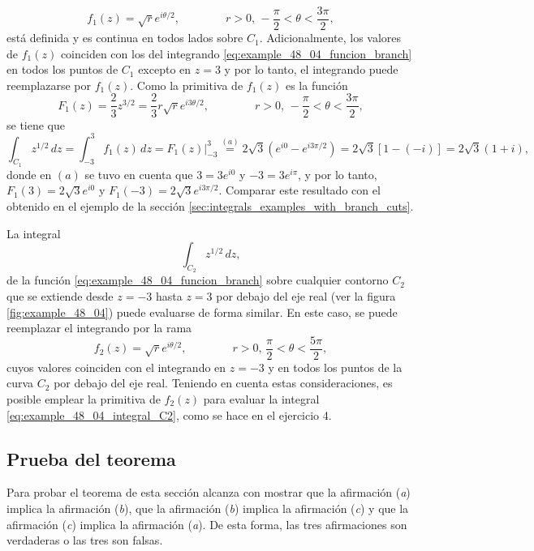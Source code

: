 \documentclass[a4paper]{report}
\begin{document}
\[
 f_1(z)=\sqrt{r}e^{i\theta/2},
 \qquad\qquad
 r>0,\,-\frac{\pi}{2}<\theta<\frac{3\pi}{2},
\]
está definida y es continua en todos lados sobre \(C_1\). Adicionalmente, los valores de \(f_1(z)\) coinciden con los del integrando \ref{eq:example_48_04_funcion_branch} en todos los puntos de \(C_1\) excepto en \(z=3\) y por lo tanto, el integrando puede reemplazarse por \(f_1(z)\). Como la primitiva de \(f_1(z)\) es la función 
\[
 F_1(z)=\frac{2}{3}z^{3/2}=\frac{2}{3}r\sqrt{r}e^{i3\theta/2},
 \qquad\qquad
 r>0,\,-\frac{\pi}{2}<\theta<\frac{3\pi}{2},
\]
se tiene que 
\begin{equation}\label{eq:example_48_04_integral_C1}
 \int_{C_1}z^{1/2}\,dz=\int_{-3}^3f_1(z)\,dz=F_1(z)\bigg|_{-3}^3\overset{(a)}{=}2\sqrt{3}(e^{i0}-e^{i3\pi/2})
 =2\sqrt{3}[1-(-i)]=2\sqrt{3}(1+i), 
\end{equation}
donde en \((a)\) se tuvo en cuenta que \(3=3e^{i0}\) y \(-3=3e^{i\pi}\), y por lo tanto, \(F_1(3)=2\sqrt{3}e^{i0}\) y \(F_1(-3)=2\sqrt{3}e^{i3\pi/2}\). Comparar este resultado  con el obtenido en el ejemplo de la sección \ref{sec:integrals_examples_with_branch_cuts}.

La integral 
\begin{equation}\label{eq:example_48_04_integral_C2}
 \int_{C_2}z^{1/2}\,dz, 
\end{equation}
de la función \ref{eq:example_48_04_funcion_branch} sobre cualquier contorno \(C_2\) que se extiende desde \(z=-3\) hasta \(z=3\) por debajo del eje real (ver la figura \ref{fig:example_48_04}) puede evaluarse de forma similar. En este caso, se puede reemplazar el integrando por la rama 
\[
 f_2(z)=\sqrt{r}e^{i\theta/2},
 \qquad\qquad
 r>0,\,\frac{\pi}{2}<\theta<\frac{5\pi}{2},
\]
cuyos valores coinciden con el integrando en \(z=-3\) y en todos los puntos de la curva \(C_2\) por debajo del eje real. Teniendo en cuenta estas consideraciones, es posible emplear la primitiva de \(f_2(z)\) para evaluar la integral \ref{eq:example_48_04_integral_C2}, como se hace en el ejercicio 4. 

\subsection*{Prueba del teorema}

Para probar el teorema de esta sección alcanza con mostrar que la afirmación (\textit{a}) implica la afirmación (\textit{b}), que la afirmación (\textit{b}) implica la afirmación (\textit{c}) y que la afirmación (\textit{c}) implica la afirmación (\textit{a}). De esta forma, las tres afirmaciones son verdaderas o las tres son falsas.
\end{document}
